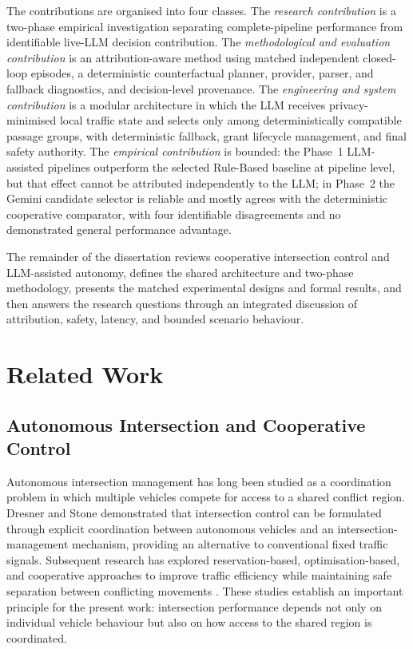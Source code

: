 \documentclass[letterpaper,10pt,conference]{ieeeconf}
\begin{document}
The contributions are organised into four classes. The \emph{research contribution} is a two-phase empirical investigation separating complete-pipeline performance from identifiable live-LLM decision contribution. The \emph{methodological and evaluation contribution} is an attribution-aware method using matched independent closed-loop episodes, a deterministic counterfactual planner, provider, parser, and fallback diagnostics, and decision-level provenance. The \emph{engineering and system contribution} is a modular architecture in which the LLM receives privacy-minimised local traffic state and selects only among deterministically compatible passage groups, with deterministic fallback, grant lifecycle management, and final safety authority. The \emph{empirical contribution} is bounded: the Phase~1 LLM-assisted pipelines outperform the selected Rule-Based baseline at pipeline level, but that effect cannot be attributed independently to the LLM; in Phase~2 the Gemini candidate selector is reliable and mostly agrees with the deterministic cooperative comparator, with four identifiable disagreements and no demonstrated general performance advantage.



The remainder of the dissertation reviews cooperative intersection control and LLM-assisted autonomy, defines the shared architecture and two-phase methodology, presents the matched experimental designs and formal results, and then answers the research questions through an integrated discussion of attribution, safety, latency, and bounded scenario behaviour.



\section{Related Work}



\subsection{Autonomous Intersection and Cooperative Control}



Autonomous intersection management has long been studied as a coordination problem in which multiple vehicles compete for access to a shared conflict region. Dresner and Stone \cite{Dresner2008} demonstrated that intersection control can be formulated through explicit coordination between autonomous vehicles and an intersection-management mechanism, providing an alternative to conventional fixed traffic signals. Subsequent research has explored reservation-based, optimisation-based, and cooperative approaches to improve traffic efficiency while maintaining safe separation between conflicting movements \cite{Safarov2022}. These studies establish an important principle for the present work: intersection performance depends not only on individual vehicle behaviour but also on how access to the shared region is coordinated.
\end{document}
